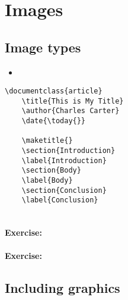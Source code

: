 	
	\section{Images}
	\label{Images}

        \subsection{Image types}
        \label{Image types}
        
        \begin{framed}
            \begin{itemize}
                \item{}
            \end{itemize}
        \end{framed}


        \begin{verbatim}
\documentclass{article}
    \title{This is My Title}
    \author{Charles Carter}
    \date{\today{}}
 
    \maketitle{}
    \section{Introduction}
    \label{Introduction}
    \section{Body}
    \label{Body}
    \section{Conclusion}
    \label{Conclusion}
    
        \end{verbatim}

        \paragraph{Exercise:}

        \paragraph{Exercise:}

        \subsection{Including graphics}
        \label{Including graphics}
        

